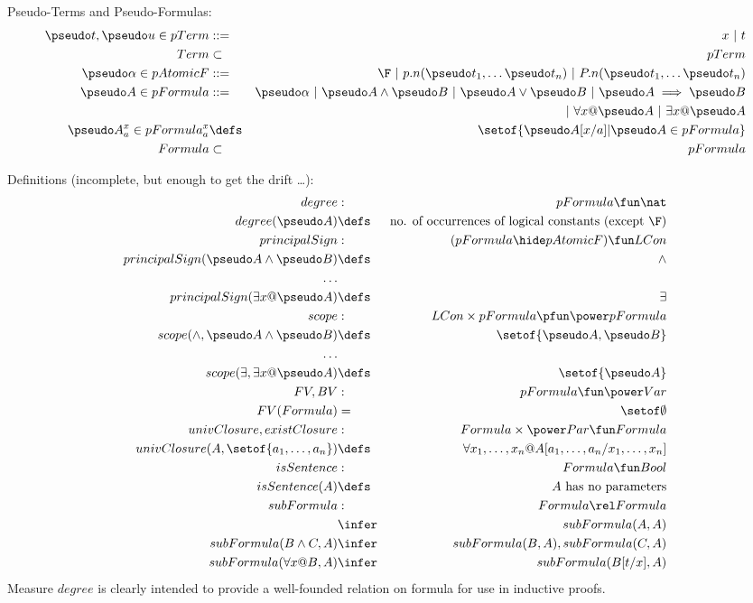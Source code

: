 Pseudo-Terms and Pseudo-Formulas:
\begin{eqnarray*}
    \pseudo t,\pseudo u \in pTerm &::=& x ~|~ t
\\ Term &\subset& pTerm
\\ \pseudo \alpha \in pAtomicF &::=& \F ~|~ p.n(\pseudo t_1, \ldots \pseudo t_n)
                                ~|~ P.n(\pseudo t_1, \ldots \pseudo t_n)
\\ \pseudo A \in pFormula &::=& \pseudo \alpha
                            ~|~ \pseudo A \land \pseudo B
                            ~|~ \pseudo A \lor \pseudo B
                            ~|~ \pseudo A \implies \pseudo B
\\                    && {} ~|~ \forall x @ \pseudo A
                            ~|~ \exists x @ \pseudo A
\\ \pseudo A^x_a \in pFormula^x_a &\defs& \setof{ \pseudo A[x/a] | \pseudo A \in pFormula }
\\ Formula &\subset& pFormula
\end{eqnarray*}

\newpage

Definitions (incomplete, but enough to get the drift \ldots):
\begin{eqnarray*}
   degree &:& pFormula \fun \nat
\\ degree(\pseudo A) &\defs& \mbox{no. of occurrences of logical constants (except \F)}
\\ principalSign &:& (pFormula \hide pAtomicF) \fun LCon
\\ principalSign(\pseudo A \land \pseudo B) &\defs& \land
\\ \ldots
\\ principalSign(\exists x @ \pseudo A) &\defs& \exists
\\ scope &:& LCon \times pFormula \pfun \power pFormula
\\ scope(\land,\pseudo A \land \pseudo B) &\defs& \setof{\pseudo A,\pseudo B}
\\ \ldots
\\ scope(\exists,\exists x @ \pseudo A) &\defs& \setof{\pseudo A}
\\ FV,BV  &:& pFormula \fun \power Var
\\ FV(Formula) &=& \setof\emptyset
\\ univClosure,existClosure &:& Formula \times \power Par \fun Formula
\\ univClosure(A,\setof{a_1,\ldots,a_n})
   &\defs&
   \forall x_1,\ldots,x_n @ A[a_1,\ldots,a_n/x_1,\ldots,x_n]
\\ isSentence &:& Formula \fun Bool
\\ isSentence(A) &\defs& A \mbox{ has no parameters}
\\ subFormula &:& Formula \rel Formula
\\ &\infer& subFormula(A,A)
\\ subFormula(B \land C,A) &\infer& subFormula(B,A), subFormula(C,A)
\\ subFormula(\forall x @ B,A) &\infer& subFormula(B[t/x],A)
\end{eqnarray*}
Measure $degree$ is clearly intended to provide a well-founded relation
on formula for use in inductive proofs.

